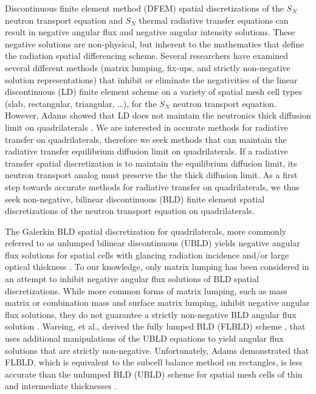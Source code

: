 \documentclass{mc2015}
\begin{document}
Discontinuous finite element method (DFEM) spatial discretizations of the $S_N$ neutron transport equation and $S_N$ thermal radiative transfer equations can result in negative angular flux and negative angular intensity solutions.  
These negative solutions are non-physical, but inherent to the mathematics that define the radiation spatial differencing scheme.
Several researchers have examined several different methods (matrix lumping\cite{adams_dfem}, fix-ups\cite{fichtl}, and strictly non-negative solution representations\cite{csz_me}) that inhibit or eliminate the negativities of the linear discontinuous (LD) finite element scheme on  a variety of spatial mesh cell types (slab, rectangular, triangular, \dots), for the $S_N$ neutron transport equation.
However, Adams showed that LD does not maintain the neutronics thick diffusion limit on quadrilaterals \cite{adams_dfem}.
We are interested in accurate methods for radiative transfer on quadrilaterals, therefore we seek methods that can maintain the radiative transfer equilibrium diffusion limit on quadrilaterals.
If a radiative transfer spatial discretization is to maintain the equilibrium diffusion limit, its neutron transport analog must preserve the the thick diffusion limit.
As a first step towards accurate methods for radiative transfer on quadrilaterals, we thus seek non-negative, bilinear discontinuous (BLD) finite element spatial discretizations of the neutron transport equation on quadrilaterals.

The Galerkin BLD spatial discretization for quadrilaterals, more commonly referred to as unlumped bilinear discontinuous (UBLD) yields negative angular flux solutions for spatial cells with glancing radiation incidence and/or large optical thickness \cite{adams_dfem}. 
To our knowledge, only matrix lumping has been considered  in an attempt to inhibit negative angular flux solutions of BLD spatial discretizations.
While more common forms of matrix lumping, such as mass matrix or combination mass and surface matrix lumping, inhibit negative angular flux solutions, they do not guarantee a strictly non-negative BLD angular flux solution \cite{adams_dfem}.
Wareing, et al., derived the fully lumped BLD (FLBLD) scheme \cite{flbld}, that uses additional manipulations of the UBLD equations to yield angular flux solutions that are strictly non-negative.
Unfortunately, Adams demonstrated that FLBLD, which is equivalent to the subcell balance method on rectangles, is less accurate than the unlumped BLD (UBLD) scheme for spatial mesh cells of thin and intermediate thicknesses \cite{adams_scb}.
\end{document}
